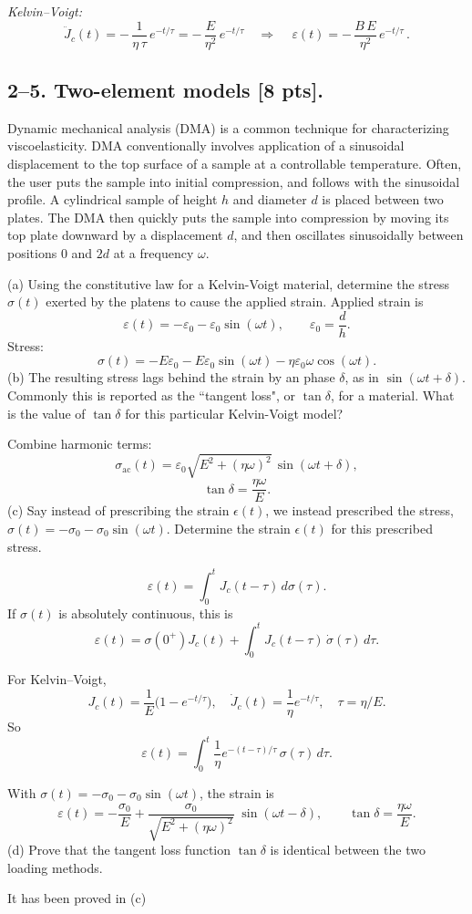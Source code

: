 \emph{Kelvin--Voigt:}
$$
\ddot J_c(t)=-\,\frac{1}{\eta\,\tau}\,e^{-t/\tau}
= -\,\frac{E}{\eta^{2}}\,e^{-t/\tau}
\quad\Rightarrow\quad
\,\varepsilon(t)=-\,\frac{B\,E}{\eta^{2}}\,e^{-t/\tau}\,.
$$
\bigskip
\subsection*{2--5. \textbf{Two-element models} [8 pts].}

Dynamic mechanical analysis (DMA) is a common technique for characterizing viscoelasticity. 
DMA conventionally involves application of a sinusoidal displacement to the top surface of a sample at a controllable temperature. 
Often, the user puts the sample into initial compression, and follows with the sinusoidal profile. 
A cylindrical sample of height $h$ and diameter $d$ is placed between two plates.
The DMA then quickly puts the sample into compression by moving its top plate downward by a displacement $d$, and then oscillates sinusoidally between positions $0$ and $2d$ at a frequency $\omega$.

\medskip
(a) Using the constitutive law for a Kelvin-Voigt material, determine the stress $\sigma(t)$ exerted by the platens to cause the applied strain. 
Applied strain is
$$
\varepsilon(t)=-\varepsilon_0-\varepsilon_0\sin(\omega t),\qquad \varepsilon_0=\frac{d}{h}.
$$
Stress:
$$
\sigma(t)=-E\varepsilon_0 - E\varepsilon_0\sin(\omega t) - \eta \varepsilon_0 \omega \cos(\omega t).
$$
\medskip
(b) The resulting stress lags behind the strain by an phase $\delta$, as in $\sin(\omega t + \delta)$. 
Commonly this is reported as the ``tangent loss", or $\tan\delta$, for a material. 
What is the value of $\tan\delta$ for this particular Kelvin-Voigt model?

Combine harmonic terms:
$$
\sigma_{\text{ac}}(t)=\varepsilon_0\sqrt{E^2+(\eta\omega)^2}\,\sin(\omega t+\delta),
$$
$$
\tan\delta=\frac{\eta\omega}{E}.
$$
\medskip
(c) Say instead of prescribing the strain $\epsilon(t)$, we instead prescribed the stress, $\sigma(t) = - \sigma_0 - \sigma_0 \sin(\omega t)$. 
Determine the strain $\epsilon(t)$ for this prescribed stress.

$$
\varepsilon(t)=\int_{0}^{t} J_c(t-\tau)\,d\sigma(\tau).
$$
If $\sigma(t)$ is absolutely continuous, this is
$$
\varepsilon(t)=\sigma(0^+)J_c(t)+\int_{0}^{t} J_c(t-\tau)\,\dot\sigma(\tau)\,d\tau.
$$

For Kelvin--Voigt,
$$
J_c(t)=\frac{1}{E}\big(1-e^{-t/\tau}\big),\quad
\dot J_c(t)=\frac{1}{\eta}e^{-t/\tau},\quad \tau=\eta/E.
$$
So
$$
\varepsilon(t)=\int_{0}^{t}\frac{1}{\eta}e^{-(t-\tau)/\tau}\,\sigma(\tau)\,d\tau.
$$

With $\sigma(t)=-\sigma_0-\sigma_0\sin(\omega t)$,
the strain is
$$
\varepsilon(t)=-\frac{\sigma_0}{E}
+\frac{\sigma_0}{\sqrt{E^2+(\eta\omega)^2}}\;\sin(\omega t-\delta),
\qquad
\tan\delta=\frac{\eta\omega}{E}.
$$
\medskip
(d) Prove that the tangent loss function $\tan\delta$ is identical between the two loading methods.

It has been proved in (c)




